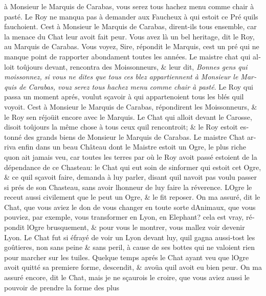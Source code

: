\documentclass[14pt,a4paper]{memoir}
\begin{document}
{{\begin{otherlanguage}{french}
{à Monsieur le Marquis de Carabas, vous serez tous hachez menu comme
chair à pasté}. Le Roy ne manqua pas à demander aux Faucheux à qui
estoit ce Pré qu\textquotesingle ils fauchoient. C\textquotesingle est à
Monsieur le Marquis de Carabas, dirent-ils tous ensemble, car la menace
du Chat leur avoit fait peur. Vous avez là un bel heritage, dit le Roy,
au Marquis de Carabas. Vous voyez, Sire, répondit le Marquis,
c\textquotesingle est un pré qui ne manque point de rapporter abondament
toutes les années. Le maistre chat qui alloit toûjours devant, rencontra
des Moissonneurs, \& leur dit, \emph{Bonnes gens qui moissonnez, si vous
ne dites que tous ces blez appartiennent à Monsieur le Marquis de
Carabas, vouz serez tous hachez menu comme chair à pasté}. Le Roy qui
passa un moment aprés, voulut sçavoir à qui appartenoient tous les blés
qu\textquotesingle il voyoit. C\textquotesingle est à Monsieur le
Marquis de Carabas, répondirent les Moissonneurs, \& le Roy
s\textquotesingle en réjoüit encore avec le Marquis. Le Chat qui alloit
devant le Carosse, disoit toûjours la même chose à tous ceux
qu\textquotesingle il rencontroit; \& le Roy estoit estonné des grands
biens de Monsieur le Marquis de Carabas. Le maistre Chat arriva enfin
dans un beau Château dont le Maistre estoit un Ogre, le plus riche
qu\textquotesingle on ait jamais veu, car toutes les terres par où le
Roy avoit passé estoient de la dépendance de ce Chasteau: le Chat qui
eut soin de s\textquotesingle informer qui estoit cet Ogre, \& ce
qu\textquotesingle il sçavoit faire, demanda à luy parler, disant
qu\textquotesingle il n\textquotesingle avoit pas voulu passer si prés
de son Chasteau, sans avoir l\textquotesingle honneur de luy faire la
réverence. L\textquotesingle Ogre le receut aussi civilement que le peut
un Ogre, \& le fit reposer. On m\textquotesingle a assuré, dit le Chat,
que vous aviez le don de vous changer en toute sorte
d\textquotesingle Animaux, que vous pouviez, par exemple, vous
transformer en Lyon, en Elephant? cela est vray, répondit
l\textquotesingle Ogre brusquement, \& pour vous le montrer, vous
m\textquotesingle allez voir devenir Lyon. Le Chat fut si éfrayé de voir
un Lyon devant luy, qu\textquotesingle il gagna aussi-tost les
goûtieres, non sans peine \& sans peril, à cause de ses bottes qui ne
valoient rien pour marcher sur les tuiles. Quelque temps aprés le Chat
ayant veu que l\textquotesingle Ogre avoit quitté sa premiere forme,
descendit, \& avoüa qu\textquotesingle il avoit eu bien peur. On
m\textquotesingle a assuré encore, dit le Chat, mais je ne sçaurois le
croire, que vous aviez aussi le pouvoir de prendre la forme des plus

\end{otherlanguage}}}
\end{document}
